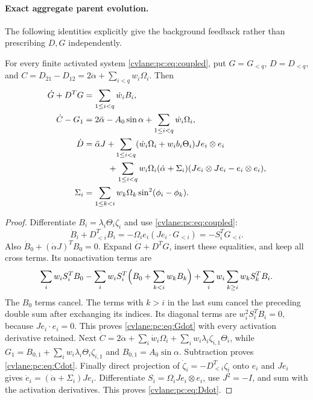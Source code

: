 \paragraph{Exact aggregate parent evolution.}
The following identities explicitly give the background feedback rather than prescribing $D,G$ independently.
\begin{cvlaneproposition}\label{cvlane:pc:prop:aggregate}
For every finite activated system \eqref{cvlane:pc:eq:coupled}, put $G=G_{<q}$, $D=D_{<q}$, and $C=D_{21}-D_{12}=2\dot\alpha+\sum_{i<q}w_i\Omega_i$. Then
\begin{align}
 \dot G+D^TG&=\sum_{1\le i<q}\dot w_i B_i,\label{cvlane:pc:eq:Gdot}\\
 \dot C-G_1&=2\ddot\alpha-A_0\sin\alpha+\sum_{1\le i<q}\dot w_i\Omega_i,\label{cvlane:pc:eq:Cdot}\\
 \dot D&=\ddot\alpha J+\sum_{1\le i<q}(\dot w_i\Omega_i+w_i b_i\Theta_i)Je_i\otimes e_i\nonumber\\
 &\hspace{10mm}+\sum_{1\le i<q}w_i\Omega_i(\dot\alpha+\Sigma_i)
 (Je_i\otimes Je_i-e_i\otimes e_i),\label{cvlane:pc:eq:Ddot}\\
 \Sigma_i&=\sum_{1\le k<i}w_k\Omega_k\sin^2(\phi_i-\phi_k).\nonumber
\end{align}
\end{cvlaneproposition}
\begin{proof}
Differentiate $B_i=\lambda_i\Theta_i\zeta_i$ and use \eqref{cvlane:pc:eq:coupled}:
\[
 \dot B_i+D_{<i}^TB_i
 =-\Omega_i e_i(Je_i\cdot G_{<i})=-S_i^TG_{<i}.
\]
Also $\dot B_0+ (\dot\alpha J)^TB_0=0$. Expand $\dot G+D^TG$, insert these equalities, and keep all cross terms. Its nonactivation terms are
\[
 \sum_i w_i S_i^TB_0-
 \sum_iw_iS_i^T\Bigl(B_0+\sum_{k<i}w_kB_k\Bigr)
 +\sum_iw_i\sum_{k\ge i}w_kS_k^TB_i.
\]
The $B_0$ terms cancel. The terms with $k>i$ in the last sum cancel the preceding double sum after exchanging its indices. Its diagonal terms are $w_i^2S_i^TB_i=0$, because $Je_i\cdot e_i=0$. This proves \eqref{cvlane:pc:eq:Gdot} with every activation derivative retained. Next $\dot C=2\ddot\alpha+\sum_i\dot w_i\Omega_i+\sum_iw_i\lambda_i\zeta_{i,1}\Theta_i$, while $G_1=B_{0,1}+\sum_iw_i\lambda_i\Theta_i\zeta_{i,1}$ and $B_{0,1}=A_0\sin\alpha$. Subtraction proves \eqref{cvlane:pc:eq:Cdot}. Finally direct projection of $\dot\zeta_i=-D_{<i}^T\zeta_i$ onto $e_i$ and $Je_i$ gives $\dot e_i=(\dot\alpha+\Sigma_i)Je_i$. Differentiate $S_i=\Omega_iJe_i\otimes e_i$, use $J^2=-I$, and sum with the activation derivatives. This proves \eqref{cvlane:pc:eq:Ddot}.
\end{proof}

